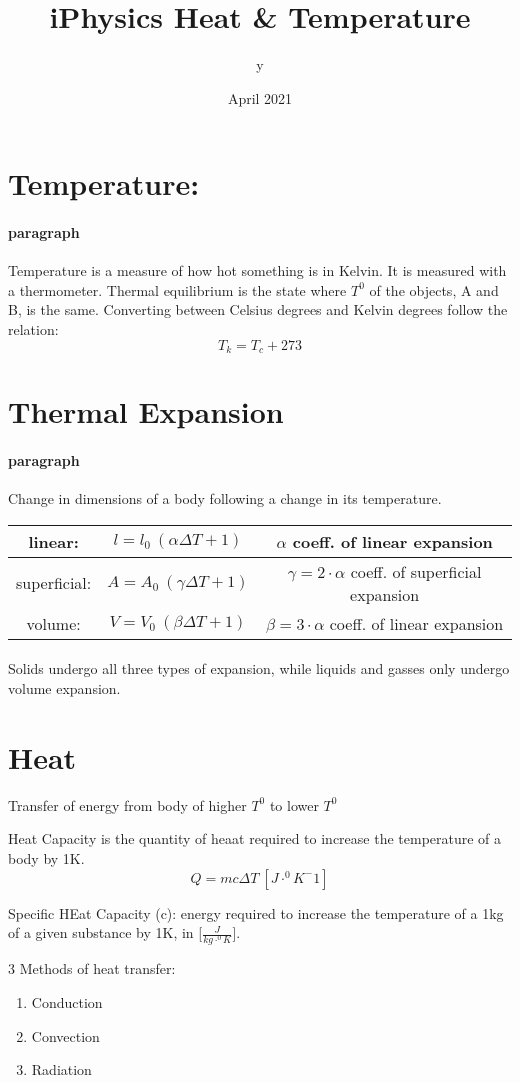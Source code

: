 \documentclass{article}
\title{iPhysics Heat \& Temperature}
\author{y}
\date{April 2021}
\begin{document}
\maketitle
\section{Temperature:}

\paragraph{paragraph}
Temperature is a measure of how hot something is in Kelvin.
It is measured with a thermometer.
Thermal equilibrium is the state where $T^0$ of the objects, A and B, is the same.
Converting between Celsius degrees and Kelvin degrees follow the relation:
$$T_k = T_c + 273$$

\section{Thermal Expansion}
\paragraph{paragraph}
Change in dimensions of a body following a change in its temperature.

\begin{tabular}{ |c|c|c| }
\hline
    linear: & $l = l_0\ (\alpha\Delta T + 1)$ & $\alpha$ coeff. of linear expansion\\
    \hline
    superficial: & $A = A_0\ (\gamma\Delta T + 1)$ & $\gamma = 2\cdot\alpha$ coeff. of superficial expansion\\
    \hline
    volume: & $V = V_0\ (\beta\Delta T + 1)$ & $\beta = 3\cdot\alpha$ coeff. of linear expansion\\
    \hline
\end{tabular}

\paragraph{}
Solids undergo all three types of expansion, while liquids and gasses only undergo volume expansion.
\section{Heat}
Transfer of energy from body of higher $T^0$ to lower $T^0$

Heat Capacity is the quantity of heaat required to increase the temperature of a body by 1K. $$Q = mc\Delta T\  [J\cdot ^0K^-1]$$

Specific HEat Capacity (c): energy required to increase the temperature of a 1kg of a given substance by 1K, in [$\frac{J}{kg\cdot ^0K}$].

3 Methods of heat transfer: 
\begin{enumerate}
    \item Conduction
    \item Convection
    \item Radiation
\end{enumerate}
\end{document}
